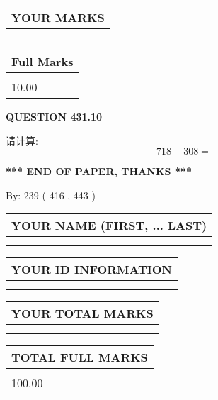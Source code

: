 \documentclass{ctexart}
\begin{document}
\vspace{0.2in}
  
\noindent\begin{tabular}{|l|}
\hline
 YOUR MARKS  \\
\hline
 \\ 
 \\ 
\hline
\end{tabular}
\hspace{0.05in} \begin{tabular}{|l|}
\hline
 Full Marks  \\
\hline
 \\ 
10.00 \\
\hline
\end{tabular}
{\textbf{\Large{QUESTION
431.10 
}}}
  
  
 
请计算:
\begin{equation}
718 -   %
308 = \nonumber
\end{equation}
 

 

 
   
   
 \vspace{0.2in}
 
   
   
   
   
\vspace{1.0in} 
{\textbf{\large{ *** END OF PAPER, THANKS *** }}} 
   
   
\hspace{1.0in} By: 
 239 ( 416 ,  443 )
   
   
   
   
\newpage 
\setcounter{page}{ 
   432001 } 
   
   
   
   
\noindent\begin{tabular}{|l|}
\hline
YOUR NAME (FIRST, ... LAST)  \\
\hline
 \\ 
 \\ 
\hline
\end{tabular}
\hspace{0.05in} \begin{tabular}{|l|}
\hline
 YOUR   ID   INFORMATION  \\
\hline
 \\ 
 \\ 
\hline
\end{tabular}
   
   
\vspace{0.2in}\noindent\begin{tabular}{|l|}
\hline
YOUR TOTAL MARKS  \\
\hline
 \\ 
 \\ 
\hline
\end{tabular}
\hspace{0.05in} \begin{tabular}{|l|}
\hline
TOTAL FULL MARKS  \\
\hline
 \\ 
100.00 \\
\hline
\end{tabular}
   
\end{document}
